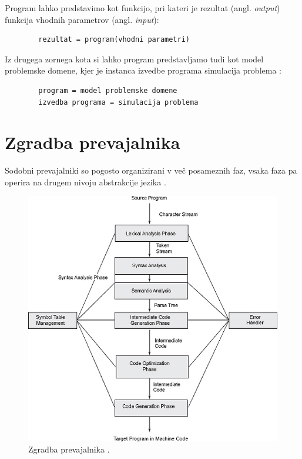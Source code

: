 \documentclass[a4paper, 12p]{book}
\begin{document}
Program lahko predstavimo kot funkcijo, pri kateri je rezultat (angl. \textit{output}) funkcija vhodnih parametrov (angl. \textit{input}):
\begin{lstlisting}
		rezultat = program(vhodni parametri)
\end{lstlisting}

Iz drugega zornega kota si lahko program predstavljamo tudi kot model problemske domene, kjer je instanca izvedbe programa simulacija problema \cite{computationalModel}:
\begin{lstlisting}
		program = model problemske domene
		izvedba programa = simulacija problema
\end{lstlisting}

\section{Zgradba prevajalnika}

Sodobni prevajalniki so pogosto organizirani v več posameznih faz, vsaka faza pa operira na drugem nivoju abstrakcije jezika \cite{modernCompiler}.

\begin{figure}[h]
	\begin{center}
		\includegraphics[width=1\textwidth]{resources/compilerStructure.jpg}
	\end{center}
	\caption{Zgradba prevajalnika \cite{compilerStructure}.}
	\label{pic1}
\end{figure}
\end{document}
